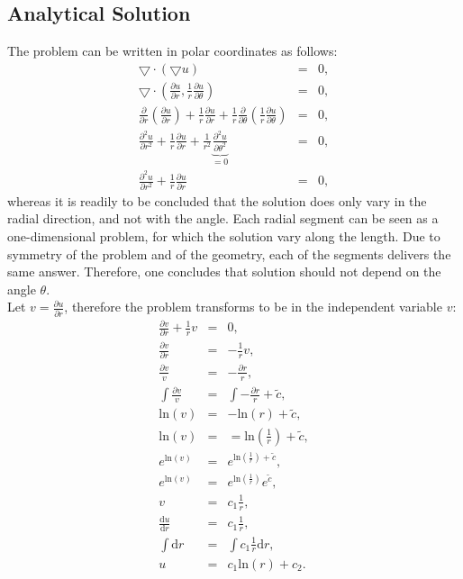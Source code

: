 \documentclass[a4paper,12pt]{article}
\begin{document}
\subsection{Analytical Solution}
The problem can be written in polar coordinates as follows:
\begin{eqnarray}
\bigtriangledown\cdot( \bigtriangledown u) &=& 0,\\
\bigtriangledown \cdot(\frac{\partial u}{\partial r}, \frac{1}{r}\frac{\partial u}{\partial \theta}) &=& 0,\\
\frac{\partial }{\partial r}(\frac{\partial u}{\partial r}) + \frac{1}{r}\frac{\partial u}{\partial r} + \frac{1}{r}\frac{\partial}{\partial \theta}(\frac{1}{r}\frac{\partial u}{\partial \theta}) &=& 0,\\
\frac{\partial ^2 u}{\partial r^2} + \frac{1}{r}\frac{\partial u}{\partial r} + \frac{1}{r^2}\underbrace{\frac{\partial^2 u}{\partial \theta^2}}_{=0} &=& 0,\\
\frac{\partial^2 u}{\partial r^2} + \frac{1}{r}\frac{\partial u}{\partial r} &=& 0,
\end{eqnarray}
whereas it is readily to be concluded that the solution does only vary in the radial direction, and not with the angle. Each radial segment can be seen as a one-dimensional problem, for which the solution vary along the length. Due to symmetry of the problem and of the geometry, each of the segments delivers the same answer. Therefore, one concludes that solution should not depend on the angle $\theta$. \\
Let $v = \frac{\partial u}{\partial r}$, therefore the problem transforms to be in the independent variable $v$:
\begin{eqnarray}
\frac{\partial v}{\partial r} + \frac{1}{r}v &=& 0,\\
\frac{\partial v}{\partial r} &=& -\frac{1}{r}v,\\
\frac{\partial v}{v} &=& -\frac{\partial r}{r},\\
\int \frac{\partial v}{v} &=& \int - \frac{\partial r}{r} + \widetilde{c},\\
\text{ln}(v) &=& - \text{ln}(r) + \widetilde{c},\\
\text{ln}(v) &=& = \text{ln}(\frac{1}{r}) + \widetilde{c},\\
e^{\text{ln}(v)} &=& e^{\text{ln}(\frac{1}{r}) + \widetilde{c}},\\
e^{\text{ln}(v)} &=& e^{\text{ln}(\frac{1}{r})}e^{\widetilde{c}},\\
v &=& c_1\frac{1}{r},\\
\frac{\text{d}u}{\text{d}r} &=& c_1\frac{1}{r},\\
\int \text{d}r &=& \int c_1\frac{1}{r} \text{d} r,\\
u &=& c_1 \text{ln}(r) + c_2.
\end{eqnarray}
\end{document}
